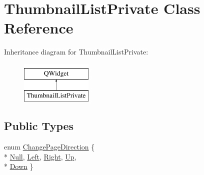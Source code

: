 \hypertarget{classThumbnailListPrivate}{\section{Thumbnail\+List\+Private Class Reference}
\label{classThumbnailListPrivate}
}
Inheritance diagram for Thumbnail\+List\+Private\+:\begin{figure}[H]
\begin{center}
\leavevmode
\includegraphics[height=2.000000cm]{classThumbnailListPrivate}
\end{center}
\end{figure}
\subsection*{Public Types}
\begin{DoxyCompactItemize}
\item 
enum \hyperlink{classThumbnailListPrivate_a28316c5b42c24bc9ab372f8e978406a4}{Change\+Page\+Direction} \{ \\*
\hyperlink{classThumbnailListPrivate_a28316c5b42c24bc9ab372f8e978406a4a70e072df3a5942ec29169a90dee2a7fc}{Null}, 
\hyperlink{classThumbnailListPrivate_a28316c5b42c24bc9ab372f8e978406a4a912a006610f67bc7eddda7af25b426a4}{Left}, 
\hyperlink{classThumbnailListPrivate_a28316c5b42c24bc9ab372f8e978406a4a906421fa5f8cd56bf16aba2657726492}{Right}, 
\hyperlink{classThumbnailListPrivate_a28316c5b42c24bc9ab372f8e978406a4ab0ee1d26fb7fc925de8fe7f285fef670}{Up}, 
\\*
\hyperlink{classThumbnailListPrivate_a28316c5b42c24bc9ab372f8e978406a4a3df30b06f7c84a030ac776720e030daa}{Down}
 \}
\end{DoxyCompactItemize}
